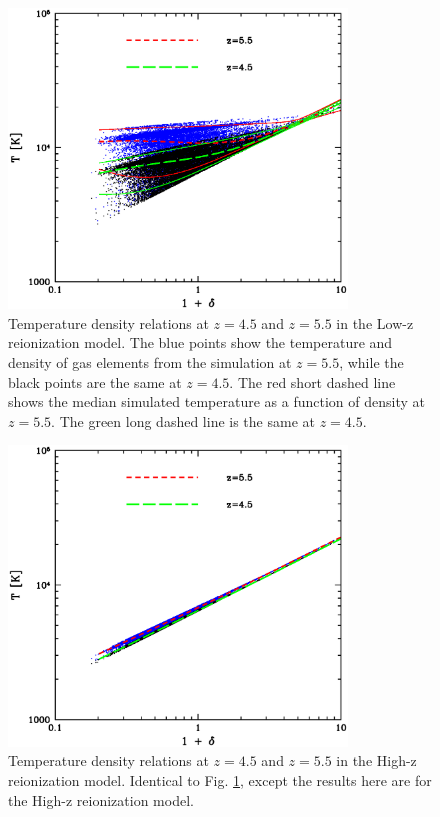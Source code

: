 \begin{figure}
\bc
\includegraphics[width=9cm]{f5.eps}
\caption{Temperature density relations at $z = 4.5$ and $z=5.5$ in the Low-z reionization model. The
blue points show the temperature and density of gas elements from the simulation at $z=5.5$, while
the black points are the same at $z=4.5$. The red short dashed line shows the median simulated temperature
as a function of density at $z=5.5$. The green long dashed line is the same at $z=4.5$.}
\label{fig:tden_lowz}
\ec
\end{figure}

\begin{figure}
\bc
\includegraphics[width=9cm]{f6.eps}
\caption{Temperature density relations at $z = 4.5$ and $z=5.5$ in the High-z reionization model.
Identical to Fig. \ref{fig:tden_lowz}, except the results here are for the High-z reionization model.}
\label{fig:tden_hiz}
\ec
\end{figure}

